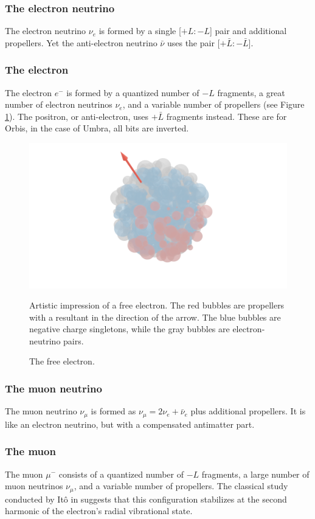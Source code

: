 \documentclass[12pt,english]{article}
\begin{document}
\subsubsection{The electron neutrino}
The electron neutrino $\nu_e$ is formed by a single [$+L:-L$] pair and additional propellers. Yet the anti-electron neutrino $\bar{\nu}$ uses the pair [$+\bar{L}:-\bar{L}$].

\subsubsection{The electron}
The electron $e^-$ is formed by a quantized number of $-L$ fragments, a great number of electron neutrinos $\nu_e$, and a variable number of propellers (see Figure \ref{fig:electron}). The positron, or anti-electron, uses $+\bar{L}$ fragments instead. These are for Orbis, in the case of Umbra, all bits are inverted.

\begin{figure}
\centering
\includegraphics[width=\linewidth]{fig1}
\caption{The free electron.}
\footnotesize{Artistic impression of a free electron. The red bubbles are propellers with a resultant in the direction of the arrow. The blue bubbles are negative charge singletons, while the gray bubbles are electron-neutrino pairs.}
\label{fig:electron}
\end{figure}

\subsubsection{The muon neutrino}
The muon neutrino $\nu_{\mu}$ is formed as $\nu_{\mu}=2\nu_e+\bar{\nu}_e$ plus additional propellers. It is like an electron neutrino, but with a compensated antimatter part.

\subsubsection{The muon}  
The muon $\mu^-$ consists of a quantized number of $-L$ fragments, a large number of muon neutrinos $\nu_{\mu}$, and a variable number of propellers. The classical study conducted by Itô in \cite{ito} suggests that this configuration stabilizes at the second harmonic of the electron's radial vibrational state.
\end{document}
